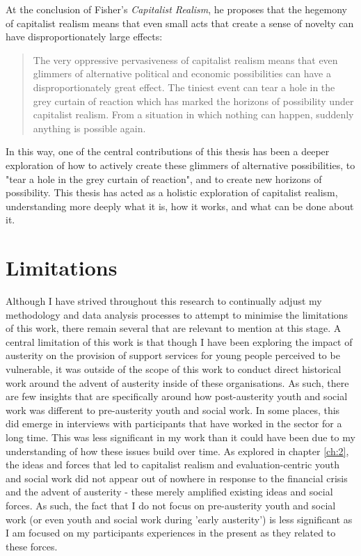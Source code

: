 At the conclusion of Fisher's \textit{Capitalist Realism}, he proposes that the hegemony of capitalist realism means that even small acts that create a sense of novelty can have disproportionately large effects:
\begin{quote}
The very oppressive pervasiveness of capitalist realism means that even glimmers of alternative political and economic possibilities can have a disproportionately great effect. The tiniest event can tear a hole in the grey curtain of reaction which has marked the horizons of possibility under capitalist realism. From a situation in which nothing can happen, suddenly anything is possible again.    
\end{quote}
In this way, one of the central contributions of this thesis has been a deeper exploration of how to actively create these glimmers of alternative possibilities, to "tear a hole in the grey curtain of reaction", and to create new horizons of possibility. This thesis has acted as a holistic exploration of capitalist realism, understanding more deeply what it is, how it works, and what can be done about it.

\section{Limitations}

Although I have strived throughout this research to continually adjust my methodology and data analysis processes to attempt to minimise the limitations of this work, there remain several that are relevant to mention at this stage. A central limitation of this work is that though I have been exploring the impact of austerity on the provision of support services for young people perceived to be vulnerable, it was outside of the scope of this work to conduct direct historical work around the advent of austerity inside of these organisations. As such, there are few insights that are specifically around how post-austerity youth and social work was different to pre-austerity youth and social work. In some places, this did emerge in interviews with participants that have worked in the sector for a long time. This was less significant in my work than it could have been due to my understanding of how these issues build over time. As explored in chapter \ref{ch:2}, the ideas and forces that led to capitalist realism and evaluation-centric youth and social work did not appear out of nowhere in response to the financial crisis and the advent of austerity - these merely amplified existing ideas and social forces. As such, the fact that I do not focus on pre-austerity youth and social work (or even youth and social work during 'early austerity') is less significant as I am focused on my participants experiences in the present as they related to these forces. 

